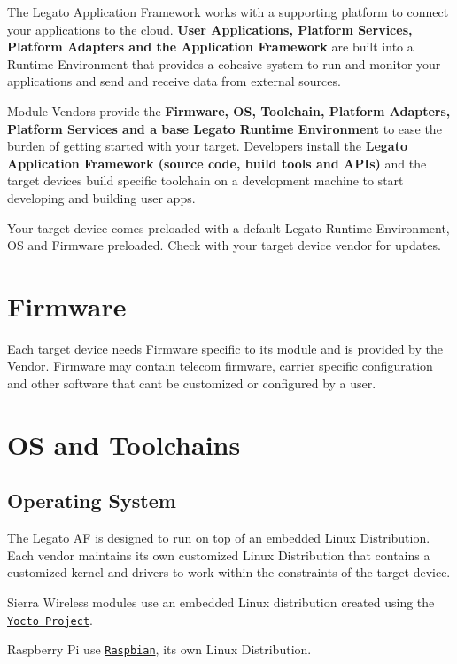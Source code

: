 The Legato Application Framework works with a supporting platform to connect your applications to the cloud. {\bfseries  User Applications, Platform Services, Platform Adapters and the Application Framework } are built into a Runtime Environment that provides a cohesive system to run and monitor your applications and send and receive data from external sources.



Module Vendors provide the {\bfseries  Firmware, OS, Toolchain, Platform Adapters, Platform Services and a base Legato Runtime Environment } to ease the burden of getting started with your target. Developers install the {\bfseries  Legato Application Framework (source code, build tools and A\+P\+Is) } and the target device\textquotesingle{}s build specific toolchain on a development machine to start developing and building user apps.

Your target device comes preloaded with a default Legato Runtime Environment, OS and Firmware preloaded. Check with your target device vendor for updates.

\section*{Firmware }

Each target device needs Firmware specific to its module and is provided by the Vendor. Firmware may contain telecom firmware, carrier specific configuration and other software that can\textquotesingle{}t be customized or configured by a user.

\section*{OS and Toolchains }

\subsection*{Operating System }

The Legato AF is designed to run on top of an embedded Linux Distribution. Each vendor maintains it\textquotesingle{}s own customized Linux Distribution that contains a customized kernel and drivers to work within the constraints of the target device.

Sierra Wireless modules use an embedded Linux distribution created using the \href{https://www.yoctoproject.org/}{\tt Yocto Project}.

Raspberry Pi use \href{https://www.raspberrypi.org/downloads/raspbian/}{\tt Raspbian}, its own Linux Distribution.


